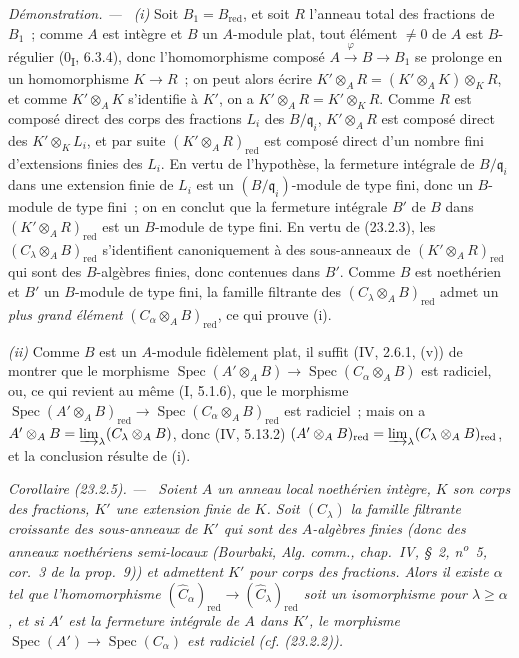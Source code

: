 \documentclass[10pt,oneside]{book}
\makeatletter
\newcommand{\setmanualcurrentlabel}[1]{\def\@currentlabel{#1}}
\newenvironment{corollary}[1][]{%
  \setmanualcurrentlabel{#1}\par\medskip\noindent\itshape Corollaire (#1). ---\ }{\par}
\newenvironment{proof}{%
  \par\medskip\noindent\textit{Démonstration. ---\ }}{\par}
\makeatother
\begin{document}
\begin{proof}
\emph{(i)} Soit $B_1=B_{\mathrm{red}}$, et soit $R$ l'anneau total des
fractions de $B_1$~; comme $A$ est intègre et $B$ un $A$-module plat, tout
élément $\neq0$ de $A$ est $B$-régulier (0\textsubscript{I}, 6.3.4), donc
l'homomorphisme composé $A\xrightarrow{\varphi}B\to B_1$ se prolonge en un
homomorphisme $K\to R$~; on peut alors écrire
$K'\otimes_AR=(K'\otimes_AK)\otimes_KR$, et comme $K'\otimes_AK$
s'identifie à $K'$, on a $K'\otimes_AR=K'\otimes_KR$. Comme $R$ est composé
direct des corps des fractions $L_i$ des $B/\mathfrak q_i$,
$K'\otimes_AR$ est composé direct des $K'\otimes_KL_i$, et par suite
$(K'\otimes_AR)_{\mathrm{red}}$ est composé direct d'un nombre fini
d'extensions finies des $L_i$. En vertu de l'hypothèse, la fermeture
intégrale de $B/\mathfrak q_i$ dans une extension finie de $L_i$ est un
$(B/\mathfrak q_i)$-module de type fini, donc un $B$-module de type fini~;
on en conclut que la fermeture intégrale $B'$ de $B$ dans
$(K'\otimes_AR)_{\mathrm{red}}$ est un $B$-module de type fini. En vertu de
(23.2.3), les $(C_\lambda\otimes_AB)_{\mathrm{red}}$ s'identifient
canoniquement à des sous-anneaux de $(K'\otimes_AR)_{\mathrm{red}}$ qui sont
des $B$-algèbres finies, donc contenues dans $B'$. Comme $B$ est noethérien
et $B'$ un $B$-module de type fini, la famille filtrante des
$(C_\lambda\otimes_AB)_{\mathrm{red}}$ admet un \emph{plus grand élément}
$(C_\alpha\otimes_AB)_{\mathrm{red}}$, ce qui prouve (i).

\emph{(ii)} Comme $B$ est un $A$-module fidèlement plat, il suffit
(IV, 2.6.1, (v)) de montrer que le morphisme
$\operatorname{Spec}(A'\otimes_AB)\to
\operatorname{Spec}(C_\alpha\otimes_AB)$ est radiciel, ou, ce qui revient au
même (I, 5.1.6), que le morphisme
$\operatorname{Spec}(A'\otimes_AB)_{\mathrm{red}}\to
\operatorname{Spec}(C_\alpha\otimes_AB)_{\mathrm{red}}$ est radiciel~; mais
on a $A'\otimes_AB=\varinjlim_\lambda(C_\lambda\otimes_AB)$, donc
(IV, 5.13.2)
$(A'\otimes_AB)_{\mathrm{red}}=
\varinjlim_\lambda(C_\lambda\otimes_AB)_{\mathrm{red}}$, et la conclusion
résulte de (i).
\end{proof}

\begin{corollary}[23.2.5]
\label{0.23.2.5-fr}
Soient $A$ un anneau local noethérien intègre, $K$ son corps des fractions,
$K'$ une extension finie de $K$. Soit $(C_\lambda)$ la famille filtrante
croissante des sous-anneaux de $K'$ qui sont des $A$-algèbres finies (donc
des anneaux noethériens semi-locaux (Bourbaki, \emph{Alg. comm.}, chap.~IV,
§~2, n\textsuperscript{o}~5, cor.~3 de la prop.~9)) et admettent $K'$ pour
corps des fractions. Alors il existe $\alpha$ tel que l'homomorphisme
$(\widehat C_\alpha)_{\mathrm{red}}\to
(\widehat C_\lambda)_{\mathrm{red}}$ soit un isomorphisme pour
$\lambda\geqslant\alpha$, et si $A'$ est la fermeture intégrale de $A$ dans
$K'$, le morphisme
$\operatorname{Spec}(A')\to\operatorname{Spec}(C_\alpha)$ est radiciel
(cf. (23.2.2)).
\end{corollary}
\end{document}
